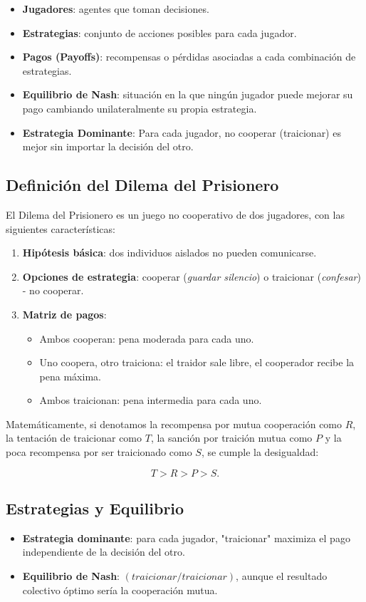 \documentclass{article}
\begin{document}
\begin{itemize}
  \item \textbf{Jugadores}: agentes que toman decisiones.
  \item \textbf{Estrategias}: conjunto de acciones posibles para cada jugador.
  \item \textbf{Pagos (Payoffs)}: recompensas o pérdidas asociadas a cada combinación de 
    estrategias.
  \item \textbf{Equilibrio de Nash}: situación en la que ningún jugador puede mejorar 
    su pago cambiando unilateralmente su propia estrategia.
  \item \textbf{Estrategia Dominante}: Para cada jugador, no cooperar (traicionar) es mejor 
    sin importar la decisión del otro.
\end{itemize}

\subsection{Definición del Dilema del Prisionero}
El Dilema del Prisionero es un juego no cooperativo de dos jugadores, con las siguientes
características:

\begin{enumerate}
  \item \textbf{Hipótesis básica}: dos individuos aislados no pueden comunicarse.
  \item \textbf{Opciones de estrategia}: cooperar (\emph{guardar silencio}) o 
    traicionar (\emph{confesar}) - no cooperar.
  \item \textbf{Matriz de pagos}:\newline
  \begin{itemize}
    \item Ambos cooperan: pena moderada para cada uno.
    \item Uno coopera, otro traiciona: el traidor sale libre, el cooperador recibe la pena máxima.
    \item Ambos traicionan: pena intermedia para cada uno.
  \end{itemize}
\end{enumerate}

Matemáticamente, si denotamos la recompensa por mutua cooperación como $R$, 
la tentación de traicionar como $T$, la sanción por traición mutua como $P$ y la poca recompensa 
por ser traicionado como $S$, se cumple la desigualdad:

\[
T > R > P > S.
\]

\subsection{Estrategias y Equilibrio}
\begin{itemize}
  \item \textbf{Estrategia dominante}: para cada jugador, "traicionar" maximiza el pago 
    independiente de la decisión del otro.
  \item \textbf{Equilibrio de Nash}: $(traicionar / traicionar)$, aunque el resultado 
    colectivo óptimo sería la cooperación mutua.
\end{itemize}
\end{document}
